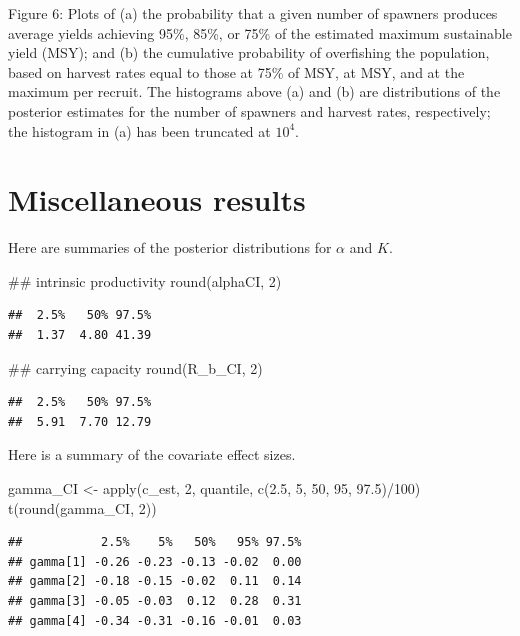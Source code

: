 \documentclass[
  11pt,
]{article}
\newenvironment{Shaded}{}{}
\newcommand{\DecValTok}[1]{#1}
\newcommand{\DocumentationTok}[1]{\textcolor[rgb]{0.00,0.50,0.00}{#1}}
\newcommand{\FloatTok}[1]{#1}
\newcommand{\FunctionTok}[1]{#1}
\newcommand{\NormalTok}[1]{#1}
\newcommand{\OtherTok}[1]{\textcolor[rgb]{1.00,0.25,0.00}{#1}}
\newcommand{\SpecialCharTok}[1]{\textcolor[rgb]{0.00,0.50,0.50}{#1}}
\begin{document}
Figure 6: Plots of (a) the probability that a given number of spawners
produces average yields achieving 95\%, 85\%, or 75\% of the estimated
maximum sustainable yield (MSY); and (b) the cumulative probability of
overfishing the population, based on harvest rates equal to those at
75\% of MSY, at MSY, and at the maximum per recruit. The histograms
above (a) and (b) are distributions of the posterior estimates for the
number of spawners and harvest rates, respectively; the histogram in (a)
has been truncated at \(10^4\).

\newpage

\hypertarget{miscellaneous-results}{%
\section{Miscellaneous results}\label{miscellaneous-results}}

Here are summaries of the posterior distributions for \(\alpha\) and
\(K\).

\begin{Shaded}
\begin{Highlighting}[]
\DocumentationTok{\#\# intrinsic productivity}
\FunctionTok{round}\NormalTok{(alphaCI, }\DecValTok{2}\NormalTok{)}
\end{Highlighting}
\end{Shaded}

\begin{verbatim}
##  2.5%   50% 97.5% 
##  1.37  4.80 41.39
\end{verbatim}

\begin{Shaded}
\begin{Highlighting}[]
\DocumentationTok{\#\# carrying capacity}
\FunctionTok{round}\NormalTok{(R\_b\_CI, }\DecValTok{2}\NormalTok{)}
\end{Highlighting}
\end{Shaded}

\begin{verbatim}
##  2.5%   50% 97.5% 
##  5.91  7.70 12.79
\end{verbatim}

Here is a summary of the covariate effect sizes.

\begin{Shaded}
\begin{Highlighting}[]
\NormalTok{gamma\_CI }\OtherTok{\textless{}{-}} \FunctionTok{apply}\NormalTok{(c\_est, }\DecValTok{2}\NormalTok{, quantile, }\FunctionTok{c}\NormalTok{(}\FloatTok{2.5}\NormalTok{, }\DecValTok{5}\NormalTok{, }\DecValTok{50}\NormalTok{, }\DecValTok{95}\NormalTok{, }\FloatTok{97.5}\NormalTok{)}\SpecialCharTok{/}\DecValTok{100}\NormalTok{)}
\FunctionTok{t}\NormalTok{(}\FunctionTok{round}\NormalTok{(gamma\_CI, }\DecValTok{2}\NormalTok{))}
\end{Highlighting}
\end{Shaded}

\begin{verbatim}
##           2.5%    5%   50%   95% 97.5%
## gamma[1] -0.26 -0.23 -0.13 -0.02  0.00
## gamma[2] -0.18 -0.15 -0.02  0.11  0.14
## gamma[3] -0.05 -0.03  0.12  0.28  0.31
## gamma[4] -0.34 -0.31 -0.16 -0.01  0.03
\end{verbatim}
\end{document}
